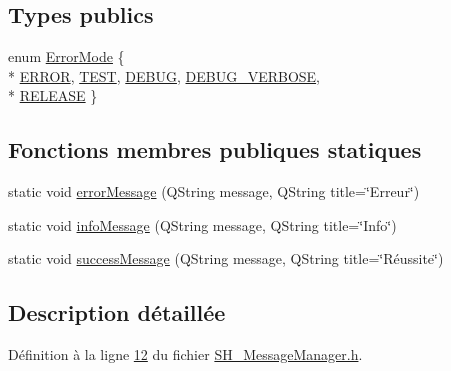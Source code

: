 \subsection*{Types publics}
\begin{DoxyCompactItemize}
\item 
enum \hyperlink{classSH__MessageManager_a13742daa1342475d4fcee295b9dee4ee}{Error\-Mode} \{ \\*
\hyperlink{classSH__MessageManager_a13742daa1342475d4fcee295b9dee4eeaed8e377759e5f203a417dbd267cbc33a}{E\-R\-R\-O\-R}, 
\hyperlink{classSH__MessageManager_a13742daa1342475d4fcee295b9dee4eea20e4a860505461ef78ebb902cac1bbc7}{T\-E\-S\-T}, 
\hyperlink{classSH__MessageManager_a13742daa1342475d4fcee295b9dee4eeac1f651f46ed4faeccbb6ce75f31c6123}{D\-E\-B\-U\-G}, 
\hyperlink{classSH__MessageManager_a13742daa1342475d4fcee295b9dee4eea10b19d57d9a8572101d39b51cdca79d0}{D\-E\-B\-U\-G\-\_\-\-V\-E\-R\-B\-O\-S\-E}, 
\\*
\hyperlink{classSH__MessageManager_a13742daa1342475d4fcee295b9dee4eea81df11b9abe47d3c95d300a3ff71227e}{R\-E\-L\-E\-A\-S\-E}
 \}
\end{DoxyCompactItemize}
\subsection*{Fonctions membres publiques statiques}
\begin{DoxyCompactItemize}
\item 
static void \hyperlink{classSH__MessageManager_a0cb4f06cf67539457482ba1c8544eb06}{error\-Message} (Q\-String message, Q\-String title=\char`\"{}Erreur\char`\"{})
\item 
static void \hyperlink{classSH__MessageManager_a0b35c2f96e6d69934bf7f7c1e2172ea9}{info\-Message} (Q\-String message, Q\-String title=\char`\"{}Info\char`\"{})
\item 
static void \hyperlink{classSH__MessageManager_a829b465beb548a78616c0c97439bf720}{success\-Message} (Q\-String message, Q\-String title=\char`\"{}Réussite\char`\"{})
\end{DoxyCompactItemize}


\subsection{Description détaillée}


Définition à la ligne \hyperlink{SH__MessageManager_8h_source_l00012}{12} du fichier \hyperlink{SH__MessageManager_8h_source}{S\-H\-\_\-\-Message\-Manager.\-h}.




